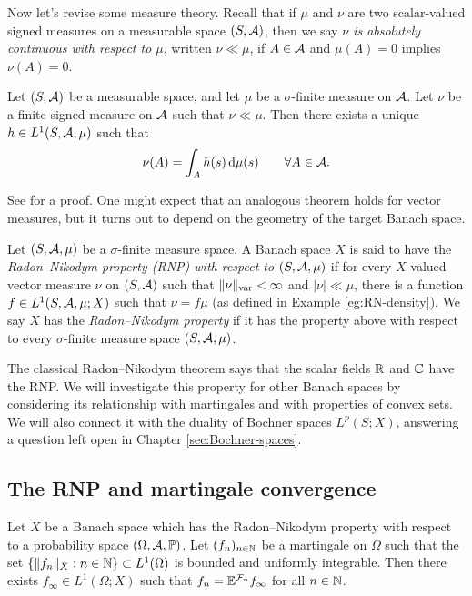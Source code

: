 Now let's revise some measure theory.
Recall that if $\mu$ and $\nu$ are two scalar-valued signed measures on a measurable space $(S,\mathcal{A})$, then we say \emph{$\nu$ is absolutely continuous with respect to $\mu$}, written $\nu \ll \mu$, if $A \in \mathcal{A}$ and $\mu(A) = 0$ implies $\nu(A) = 0$.

\begin{thm}
  Let $(S,\mathcal{A})$ be a measurable space, and let $\mu$ be a $\sigma$-finite measure on $\mathcal{A}$.
  Let $\nu$ be a finite signed measure on $\mathcal{A}$ such that $\nu \ll \mu$.
  Then there exists a unique $h \in L^1(S,\mathcal{A},\mu)$ such that
  \begin{equation*}
    \nu(A) = \int_{A} h(s) \, \mathrm{d}\mu(s) \qquad \forall A \in \mathcal{A}.
  \end{equation*}
\end{thm}

See \cite[Theorem 5.5.4]{rD04} for a proof.
One might expect that an analogous theorem holds for vector measures, but it turns out to depend on the geometry of the target Banach space.

\begin{defn}
  Let $(S,\mathcal{A},\mu)$ be a $\sigma$-finite measure space.
  A Banach space $X$ is said to have the \emph{Radon--Nikodym property (RNP) with respect to $(S,\mathcal{A},\mu)$} if for every $X$-valued vector measure $\nu$ on $(S,\mathcal{A})$ such that $\|\nu\|_{\mathrm{var}} < \infty$ and $|\nu| \ll \mu$, there is a function $f \in L^1(S,\mathcal{A},\mu;X)$ such that $\nu = f\mu$ (as defined in Example \ref{eg:RN-density}).
  We say $X$ has the \emph{Radon--Nikodym property} if it has the property above with respect to every $\sigma$-finite measure space $(S,\mathcal{A},\mu)$.
\end{defn}

The classical Radon--Nikodym theorem says that the scalar fields $\mathbb{R}$ and $\mathbb{C}$ have the RNP.
We will investigate this property for other Banach spaces by considering its relationship with martingales and with properties of convex sets.
We will also connect it with the duality of Bochner spaces $L^p(S;X)$, answering a question left open in Chapter \ref{sec:Bochner-spaces}.

\subsection{The RNP and martingale convergence}

\begin{thm}
  Let $X$ be a Banach space which has the Radon--Nikodym property with respect to a probability space $(\Omega,\mathcal{A},\mathbb{P})$.
  Let $(f_n)_{n \in \mathbb{N}}$ be a martingale on $\Omega$ such that the set $\{\|f_n\|_X : n \in \mathbb{N}\} \subset L^1(\Omega)$ is bounded and uniformly integrable.
  Then there exists $f_\infty \in L^1(\Omega;X)$ such that $f_n = \mathbb{E}^{\mathcal{F}_n} f_\infty$ for all $n \in \mathbb{N}$.
\end{thm}

